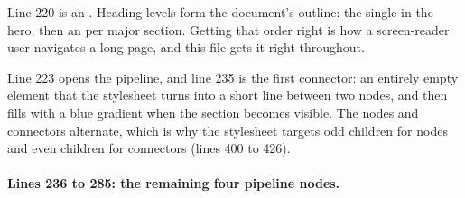 Line 220 is an . Heading levels form the document's outline: the single
 in the hero, then an  per major section. Getting that order
right is how a screen-reader user navigates a long page, and this file gets it
right throughout.

Line 223 opens the pipeline, and line 235 is the first connector: an entirely
empty element that the stylesheet turns into a short line between two nodes, and
then fills with a blue gradient when the section becomes visible. The nodes and
connectors alternate, which is why the stylesheet targets odd children for nodes
and even children for connectors (lines 400 to 426).

\paragraph{Lines 236 to 285: the remaining four pipeline nodes.}

